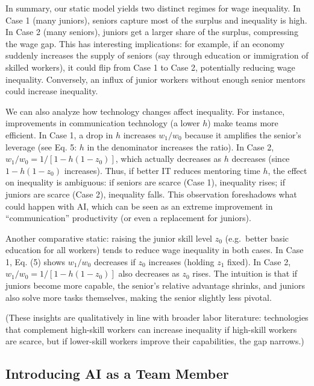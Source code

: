 \documentclass[12pt]{article}
\begin{document}
In summary, our static model yields two distinct regimes for wage
inequality. {In Case 1 (many juniors), seniors capture most of
the surplus and inequality is high}. {In Case 2 (many seniors),
juniors get a larger share of the surplus, compressing the wage gap.}
This has interesting implications: for example, if an economy suddenly
increases the supply of seniors (say through education or immigration of
skilled workers), it could flip from Case 1 to Case 2, potentially
{reducing wage inequality}. Conversely, an influx of junior workers
without enough senior mentors could increase inequality.

We can also analyze how {technology changes} affect inequality.
For instance, improvements in communication technology (a lower \(h\))
make teams more efficient. In Case 1, a drop in \(h\) {increases}
\(w_1/w_0\) because it amplifies the senior's leverage (see Eq. 5: \(h\)
in the denominator increases the ratio). In Case 2,
\(w_1/w_0 = 1/[1-h(1-z_0)]\), which actually {decreases} as \(h\)
decreases (since \(1 - h(1-z_0)\) increases). Thus, if better IT reduces
mentoring time \(h\), the effect on inequality is ambiguous: {if
seniors are scarce (Case 1), inequality rises; if juniors are scarce
(Case 2), inequality falls.} This observation foreshadows what could
happen with AI, which can be seen as an extreme improvement in
``communication'' productivity (or even a replacement for juniors).

Another comparative static: raising the junior skill level \(z_0\)
(e.g.~better basic education for all workers) tends to {reduce
wage inequality} in both cases. In Case 1, Eq. (5) shows \(w_1/w_0\)
decreases if \(z_0\) increases (holding \(z_1\) fixed). In Case 2,
\(w_1/w_0 = 1/[1-h(1-z_0)]\) also decreases as \(z_0\) rises. The
intuition is that if juniors become more capable, the senior's relative
advantage shrinks, and juniors also solve more tasks themselves, making
the senior slightly less pivotal.

{(These insights are qualitatively in line with broader labor
literature: technologies that complement high-skill workers can increase
inequality if high-skill workers are scarce, but if lower-skill workers
improve their capabilities, the gap narrows.)}

\subsection{Introducing AI as a Team
Member}\label{introducing-ai-as-a-team-member}
\end{document}
